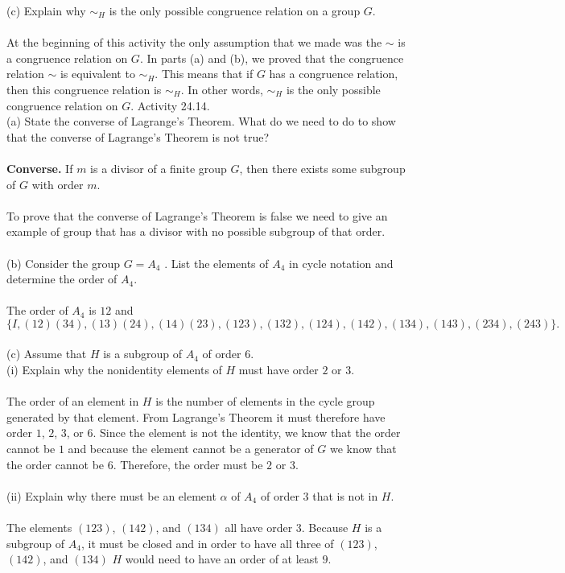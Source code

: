 \documentclass[11pt,a4paper]{article}
\begin{document}
(c) Explain why $\sim_H$ is the only possible congruence relation on a group $G$.\\
~\\
At the beginning of this activity the only assumption that we made was the $\sim$ is a congruence relation on $G$. In parts (a) and (b), we proved that the congruence relation $\sim$ is equivalent to $\sim_H$. This means that if $G$ has a congruence relation, then this congruence relation is $\sim_H$. In other words, $\sim_H$ is the only possible congruence relation on $G$.
Activity 24.14.\\
(a) State the converse of Lagrange's Theorem. What do we need to do to show that the converse of Lagrange's Theorem is not true?\\
~\\
{\bf Converse.} If  $m$ is a divisor of a finite group $G$, then there exists some subgroup of $G$ with order $m$.\\
~\\
To prove that the converse of Lagrange's Theorem is false we need to give an example of group that has a divisor with no possible subgroup of that order.\\
~\\
(b) Consider the group $G = A_4$ . List the elements of $A_4$ in cycle notation and determine the order of $A_4$.\\
~\\
The order of $A_4$ is $12$ and 
\[\{ I, (12)(34), (13)(24), (14)(23), (123), (132), (124), (142), (134), (143), (234), (243) \}.\]
\\
(c) Assume that $H$ is a subgroup of $A_4$ of order $6$.\\
(i) Explain why the nonidentity elements of $H$ must have order $2$ or $3$.\\
~\\
The order of an element in $H$ is the number of elements in the cycle group generated by that element. From Lagrange's Theorem it must therefore have order $1$, $2$, $3$, or $6$. Since the element is not the identity, we know that the order cannot be $1$ and because the element cannot be a generator of $G$ we know that the order cannot be $6$. Therefore, the order must be $2$ or $3$.\\
~\\
(ii) Explain why there must be an element $\alpha$ of $A_4$ of order $3$ that is not in $H$.\\
~\\
The elements $(123)$, $(142)$, and $(134)$ all have order $3$. Because $H$ is a subgroup of $A_4$, it must be closed and in order to have all three of $(123)$, $(142)$, and $(134)$ $H$ would need to have an order of at least $9$.\\
\end{document}
